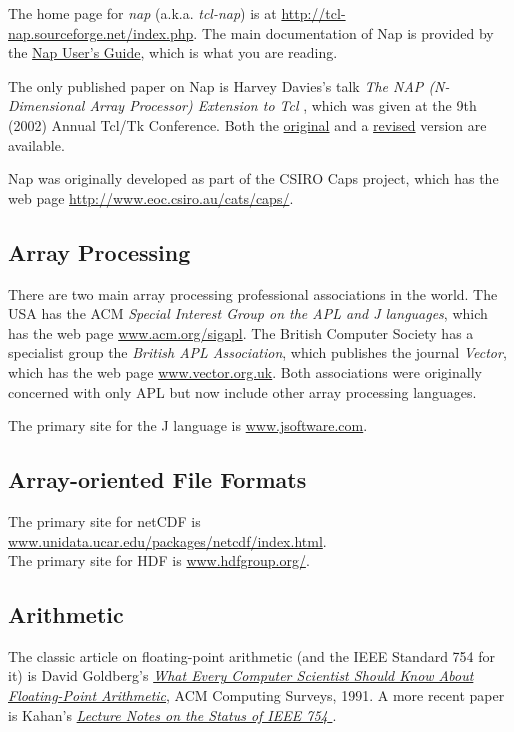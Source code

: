 The home page for 
  \emph{nap} (a.k.a.
  \emph{tcl-nap}) is at 
  \href{http://tcl-nap.sourceforge.net/index.php}{http://tcl-nap.sourceforge.net/index.php}.
The main documentation of Nap is provided by the
  \href{http://tcl-nap.sourceforge.net/nap_users_guide.pdf}{Nap User's Guide},
which is what you are reading.
  \par The only published paper on Nap is Harvey Davies's talk 
  \emph{The NAP (N-Dimensional Array Processor) Extension to Tcl}
  , which was given at the 9th (2002) Annual Tcl/Tk Conference.
Both the
\href{http://aspn.activestate.com/ASPN/Tcl/TclConferencePapers2002/Tcl2002papers/davies-nap/nap.pdf}{original}
and a
  \href{http://tcl-nap.sourceforge.net/nap_paper2002.pdf}{revised} version are available.
  \par Nap was originally developed as part of the CSIRO Caps project,
  which has the web page 
  \href{http://www.eoc.csiro.au/cats/caps/}{http://www.eoc.csiro.au/cats/caps/}.

\subsection{Array Processing}
    \label{refs-array}

There are two main array processing professional associations in
  the world. The USA has the ACM 
  \emph{Special Interest Group on the APL and J languages}, which has
  the web page 
  \href{http://www.acm.org/sigapl}{www.acm.org/sigapl}. The
  British Computer Society has a specialist group the 
  \emph{British APL Association}, which publishes the journal 
  \emph{Vector}, which has the web page 
  \href{http://www.vector.org.uk}{www.vector.org.uk}. Both
  associations were originally concerned with only APL but now include
  other array processing languages.
  \par The primary site for the J language is 
  \href{http://www.jsoftware.com}{www.jsoftware.com}.

\subsection{Array-oriented File Formats}
    \label{refs-file}

The primary site for netCDF is 
  \href{http://www.unidata.ucar.edu/packages/netcdf/index.html}{www.unidata.ucar.edu/packages/netcdf/index.html}.
  \\The primary site for HDF is 
  \href{http://www.hdfgroup.org/}{www.hdfgroup.org/}.

\subsection{Arithmetic}
    \label{refs-Arithmetic}

The classic article on floating-point arithmetic (and the IEEE
  Standard 754 for it) is David Goldberg's 
\href{http://portal.acm.org/citation.cfm?id=103163&coll=GUIDE&dl=ACM&CFID=36776917&CFTOKEN=647870&ret=1#Fulltext}
{\emph{What Every Computer Scientist Should Know About Floating-Point Arithmetic}},
ACM Computing Surveys, 1991.
A more recent paper is Kahan's
  \href{http://www.cs.berkeley.edu/~wkahan/ieee754status/ieee754.ps} {\emph{Lecture 
    Notes on the Status of IEEE 754} }.
